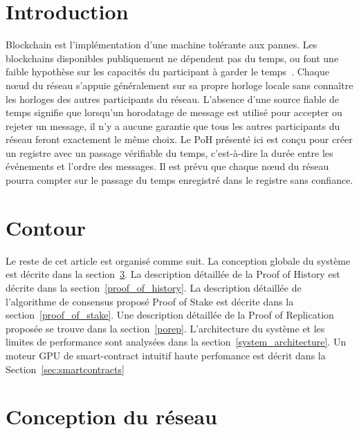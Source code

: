\documentclass[12pt]{article}
\begin{document}
\section{Introduction}\normalsize
Blockchain est l’implémentation d'une machine tolérante aux pannes. Les blockchains disponibles publiquement ne dépendent pas du temps, ou font une faible hypothèse sur les capacités du participant à garder le temps~\cite{tendermint,hashgraph}. Chaque nœud du réseau s'appuie généralement sur sa propre horloge locale sans connaître les horloges des autres participants du réseau. L'absence d'une source fiable de temps signifie que lorsqu'un horodatage de message est utilisé pour accepter ou rejeter un message, il n'y a aucune garantie que tous les autres participants du réseau feront exactement le même choix. Le PoH présenté ici est conçu pour créer un registre avec un passage vérifiable du temps, c'est-à-dire la durée entre les événements et l'ordre des messages. Il est prévu que chaque nœud du réseau pourra compter sur le passage du temps enregistré dans le registre sans confiance.

\section{Contour}
Le reste de cet article est organisé comme suit. La conception globale du système est décrite dans la section~\ref{design}. La description détaillée de la Proof of History est décrite dans la section~\ref{proof_of_history}. La description détaillée de l'algorithme de consensus proposé Proof of Stake est décrite dans la section~\ref{proof_of_stake}. Une description détaillée de la Proof of Replication proposée se trouve dans la section~\ref{porep}. L'architecture du système et les limites de performance sont analysées dans la section~\ref{system_architecture}. Un moteur GPU de smart-contract intuitif haute perfomance est décrit dans la Section~\ref{sec:smartcontracts}

\section{Conception du réseau}\label{design}
\end{document}
